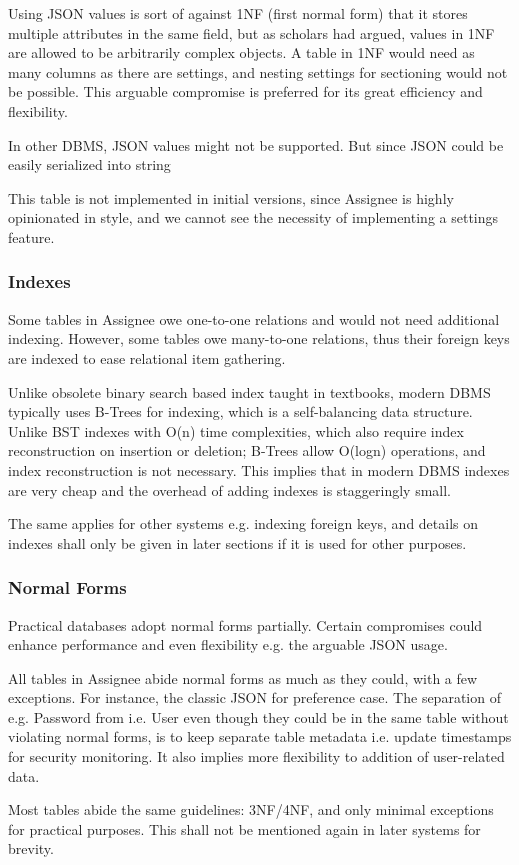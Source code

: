 Using JSON values is sort of against 1NF (first normal form) that it stores
multiple attributes in the same field, but as scholars had argued, values in 1NF
are allowed to be arbitrarily complex objects. A table in 1NF would need as many
columns as there are settings, and nesting settings for sectioning would not be
possible. This arguable compromise is preferred for its great efficiency and flexibility.

\textdagger{} In other DBMS, JSON values might not be supported. But since JSON
could be easily serialized into string

\textdagger{} This table is not implemented in initial versions, since Assignee is
highly opinionated in style, and we cannot see the necessity of implementing a
settings feature.

\subsubsection{Indexes}
\label{data-layer.design.user.indexes}

Some tables in Assignee owe one-to-one relations and would not need additional indexing.
However, some tables owe many-to-one relations, thus their foreign keys are
indexed to ease relational item gathering.

Unlike obsolete binary search based index taught in textbooks, modern DBMS typically
uses B-Trees for indexing, which is a self-balancing data structure. Unlike BST indexes
with O(n) time complexities, which also require index reconstruction on insertion
or deletion; B-Trees allow O(logn) operations, and index reconstruction is not
necessary. This implies that in modern DBMS indexes are very cheap and the overhead
of adding indexes is staggeringly small.

The same applies for other systems e.g. indexing foreign keys, and details on indexes
shall only be given in later sections if it is used for other purposes.

\subsubsection{Normal Forms}
\label{data-layer.design.user.normals}

Practical databases adopt normal forms partially. Certain compromises could enhance
performance and even flexibility e.g. the arguable JSON usage.

All tables in Assignee abide normal forms as much as they could, with a few exceptions.
For instance, the classic JSON for preference case. The separation of e.g. Password
from i.e. User even though they could be in the same table without violating
normal forms, is to keep separate table metadata i.e. update timestamps for
security monitoring. It also implies more flexibility to addition of user-related
data.

Most tables abide the same guidelines: 3NF/4NF, and only minimal exceptions for practical
purposes. This shall not be mentioned again in later systems for brevity.